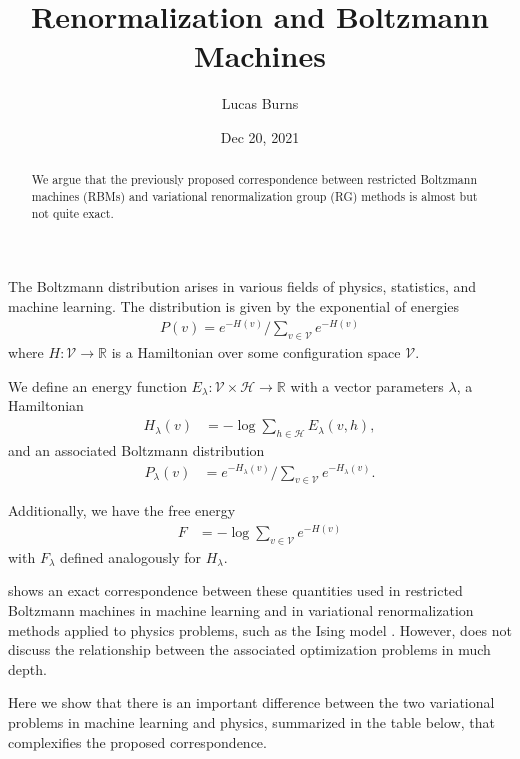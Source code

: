 \documentclass{article}
\title{Renormalization and Boltzmann Machines}
\author{Lucas Burns}
\date{Dec 20, 2021}
\theoremstyle{remark}
\theoremstyle{definition}
\begin{document}
\maketitle

\begin{abstract}
    We argue that the previously proposed correspondence between restricted Boltzmann machines (RBMs) and variational renormalization group (RG) methods \cite{mehta_exact_2014} is almost but not quite exact.
\end{abstract}

The Boltzmann distribution arises in various fields of physics, statistics, and machine learning. The distribution is given by the exponential of energies
\begin{align}
    P(v) = e^{-H(v)}/\sum_{v \in \mathcal V} e^{-H(v)}
\end{align}
where $H : \mathcal V \to \mathbb R$ is a Hamiltonian over some configuration space $\mathcal V$.

We define an energy function $E_\lambda : \mathcal V \times \mathcal H \to \mathbb R$ with a vector parameters $\lambda$, a Hamiltonian
\begin{align}
    H_\lambda(v) &= - \log \sum_{h \in \mathcal H} E_\lambda(v,h),
\end{align}
and an associated Boltzmann distribution
\begin{align}
    P_\lambda(v) &= e^{-H_\lambda(v)}/\sum_{v \in \mathcal V} e^{-H_\lambda(v)}.
\end{align}

Additionally, we have the free energy
\begin{align}
    F &= -\log \sum_{v \in \mathcal V} e^{-H(v)}
\end{align}
with $F_\lambda$ defined analogously for $H_\lambda$.

\cite{mehta_exact_2014} shows an exact correspondence between these quantities used in restricted Boltzmann machines in machine learning and in variational renormalization methods applied to physics problems, such as the Ising model \cite{wilson_renormalization_1974, kadanoff_statistical_2000}. However, \cite{mehta_exact_2014} does not discuss the relationship between the associated optimization problems in much depth. 

Here we show that there is an important difference between the two variational problems in machine learning and physics, summarized in the table below, that complexifies the proposed correspondence.
\end{document}
